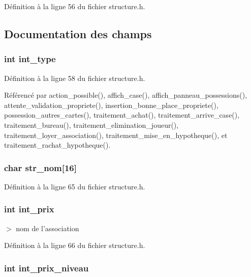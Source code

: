 D\'{e}finition \`{a} la ligne 56 du fichier structure.h.

\subsection{Documentation des champs}
\subsubsection{\setlength{\rightskip}{0pt plus 5cm}int {\bf int\_\-type}}\label{structcases_9e5cc6f5098bf7a5daebf7fff66ae4ff}




D\'{e}finition \`{a} la ligne 58 du fichier structure.h.

R\'{e}f\'{e}renc\'{e} par action\_\-possible(), affich\_\-case(), affich\_\-panneau\_\-possessions(), attente\_\-validation\_\-propriete(), insertion\_\-bonne\_\-place\_\-propriete(), possession\_\-autres\_\-cartes(), traitement\_\-achat(), traitement\_\-arrive\_\-case(), traitement\_\-bureau(), traitement\_\-elimination\_\-joueur(), traitement\_\-loyer\_\-association(), traitement\_\-mise\_\-en\_\-hypotheque(), et traitement\_\-rachat\_\-hypotheque().
\subsubsection{\setlength{\rightskip}{0pt plus 5cm}char {\bf str\_\-nom}[16]}\label{structcases_7aff4a82bb491977caaf0233892417b9}




D\'{e}finition \`{a} la ligne 65 du fichier structure.h.
\subsubsection{\setlength{\rightskip}{0pt plus 5cm}int {\bf int\_\-prix}}\label{structcases_c9db1f873250edd2a571697a37d83ce2}


$>$ nom de l'association 



D\'{e}finition \`{a} la ligne 66 du fichier structure.h.
\subsubsection{\setlength{\rightskip}{0pt plus 5cm}int {\bf int\_\-prix\_\-niveau}}\label{structcases_8c5dd17254064c8c96fde34e69b60ab3}


